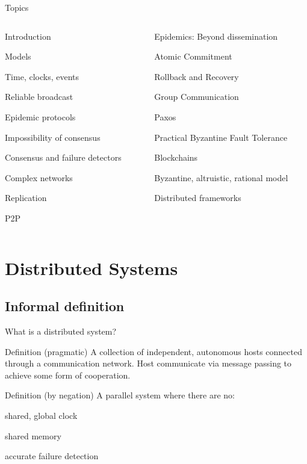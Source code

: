 \begin{frame}[shrink]{Topics}

\begin{columns}
\begin{column}{0.44\textwidth}
\BI
\item Introduction
\item Models
\item Time, clocks, events
\item Reliable broadcast
\item Epidemic protocols
\item Impossibility of consensus
\item Consensus and failure detectors
\item Complex networks
\item Replication
\item P2P
\EI
\end{column}
\begin{column}{0.56\textwidth}
\BI
\item Epidemics: Beyond dissemination
\item Atomic Commitment
\item Rollback and Recovery
\item Group Communication
\item Paxos
\item Practical Byzantine Fault Tolerance
\item Blockchains
\item Byzantine, altruistic, rational model
\item Distributed frameworks
\EI
\end{column}
\end{columns}

\end{frame}



\section{Distributed Systems}

\subsection{Informal definition}

\begin{frame}{What is a distributed system?}
	
\begin{block}{Definition (pragmatic)}
A collection of independent, autonomous hosts connected through a
communication network. Host communicate via message passing to achieve some
form of cooperation.
\end{block}

\pause
\bigskip
\begin{block}{Definition (by negation)}
A parallel system where there are no:
\BI
\item shared, global clock
\item shared memory
\item accurate failure detection
\EI
\end{block}

\end{frame}

